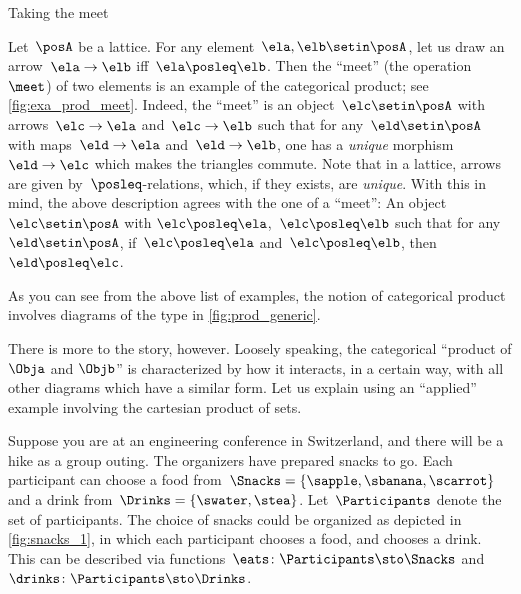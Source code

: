 \begin{marginfigure}
    \centering
    \caption{Taking the meet}
    \label{fig:exa_prod_meet}
\end{marginfigure}

\begin{example}
    \label{exa:meet-as-prod}
    Let~$\posA$ be a lattice.
    For any element~$\ela, \elb \setin \posA$, let us draw an arrow~$\ela \to \elb$ iff~$\ela \posleq \elb$.
    Then the ``meet'' (the operation~$\meet$) of two elements is an example of the categorical product; see \cref{fig:exa_prod_meet}.
    Indeed, the ``meet'' is an object~$\elc \setin \posA$ with arrows~$\elc\to \ela$ and~$\elc \to \elb$ such that for any~$\eld\setin \posA$ with maps~$\eld\to \ela$ and~$\eld\to \elb$, one has a \emph{unique} morphism~$\eld\to \elc$ which makes the triangles commute.
    Note that in a lattice, arrows are given by~$\posleq$-relations, which, if they exists, are \emph{unique}.
    With this in mind, the above description agrees with the one of a ``meet'':
    An object~$\elc\setin \posA$ with $\elc\posleq \ela$,~$\elc\posleq \elb$ such that for any~$\eld\setin \posA$, if~$\elc\posleq \ela$ and~$\elc\posleq \elb$, then~$\eld\posleq \elc$.
\end{example}

\begin{marginfigure}
    \centering
    \caption{}
    \label{fig:prod_generic}
\end{marginfigure}

As you can see from the above list of examples, the notion of categorical product involves diagrams of the type in \cref{fig:prod_generic}.

There is more to the story, however.
Loosely speaking, the categorical ``product of $\Obja$ and $\Objb$'' is characterized by how it interacts, in a certain way, with all other diagrams which have a similar form.
Let us explain using an ``applied'' example involving the cartesian product of sets.

Suppose you are at an engineering conference in Switzerland, and there will be a hike as a group outing.
The organizers have prepared snacks to go.
Each participant can choose a food from~$\Snacks=\{\sapple,\sbanana,\scarrot\}$ and a drink from~$\Drinks=\{\swater,\stea\}$.
Let~$\Participants$ denote the set of participants.
The choice of snacks could be organized as depicted in \cref{fig:snacks_1}, in which each participant chooses a food, and chooses a drink.
This can be described via functions~$\eats \colon \Participants \sto \Snacks$ and~$\drinks \colon  \Participants \sto \Drinks$.

